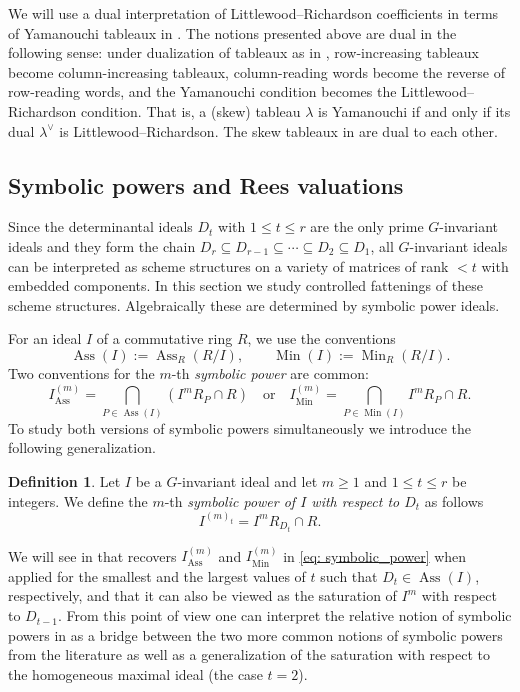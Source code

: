 \documentclass[11pt, reqno]{amsart}
\numberwithin{equation}{section}
\theoremstyle{definition}
\newtheorem{definition}[theorem]{Definition}
\DeclareMathOperator{\Ass}{Ass}
\DeclareMathOperator{\Min}{Min}
\renewcommand{\l}{\lambda}
\begin{document}
We will use a dual interpretation of Littlewood--Richardson coefficients in terms of Yamanouchi tableaux in .
The notions presented above are dual in the following sense: under dualization of tableaux as in , row-increasing tableaux become column-increasing tableaux, column-reading words become the reverse of row-reading words, and the Yamanouchi condition becomes the Littlewood--Richardson condition. That is, a (skew) tableau $\l$ is Yamanouchi if and only if its dual $\l^\vee$ is Littlewood--Richardson. The skew tableaux in  are dual to each other.

\subsection{Symbolic powers and Rees valuations}

Since the determinantal ideals $D_t$ with $1\leq t\leq r$ are the only prime $G$-invariant ideals \cite[Theorem 5.2]{deconcini1980young} and they form the chain $D_r\subseteq D_{r-1}\subseteq\cdots\subseteq D_2\subseteq D_1$, all $G$-invariant ideals can be interpreted as scheme structures  on a variety of matrices of rank $<t$ with embedded components. In this section we study  controlled fattenings of these scheme structures. Algebraically these are determined by symbolic power ideals.

For an ideal $I$ of a commutative ring $R$, we use the conventions
\[
\Ass(I):=\Ass_R(R/I),\qquad \Min(I):=\Min_R(R/I).
\]
Two conventions for the $m$-th {\em symbolic power} are common:
\begin{equation}\label{eq: symbolic_power}
I_{\Ass}^{(m)}=\bigcap_{P\in \Ass(I)} \left(I^m R_P\cap R \right) \quad \text{or} \quad I_{\Min}^{(m)}=\bigcap_{P\in \Min(I)} I^m R_P\cap R.
\end{equation}
To study both versions of symbolic powers simultaneously we introduce the following generalization.

\begin{definition}\label{def: symbolic_power}
Let $I$ be a $G$-invariant ideal and let $m\geq 1$ and $1\leq t\leq r$ be integers. We define the $m$-th {\em symbolic power of $I$ with respect to $D_t$} as follows
\[
I^{(m)_t}= I^m R_{D_t}\cap R.
\]
\end{definition}
We will see in  that  recovers $I_{\Ass}^{(m)}$ and $I_{\Min}^{(m)}$ in  \eqref{eq: symbolic_power} when applied for the smallest and the largest values of $t$ such that $D_t\in \Ass(I)$, respectively, and that it can also be viewed as the saturation of $I^m$ with respect to $D_{t-1}$. From this point of view one can interpret the relative notion of symbolic powers in  as a bridge between the two more common notions of symbolic powers from the literature as well as a generalization of the saturation with respect to the homogeneous maximal ideal (the case $t=2$).
\end{document}
